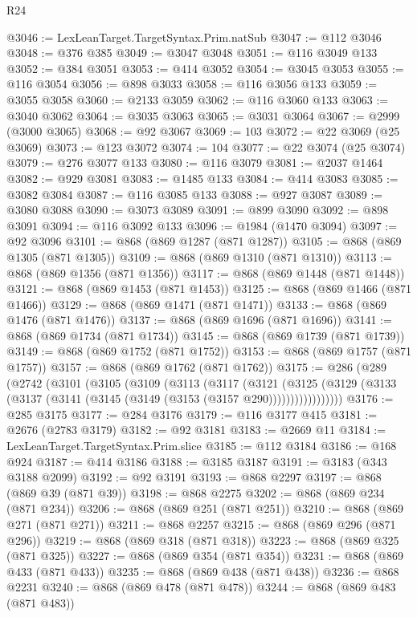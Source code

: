 \begin{lexlean}{R24}
\begin{coremodule}
@3046 := LexLeanTarget.TargetSyntax.Prim.natSub
@3047 := @112 @3046
@3048 := @376 @385
@3049 := @3047 @3048
@3051 := @116 @3049 @133
@3052 := @384 @3051
@3053 := @414 @3052
@3054 := @3045 @3053
@3055 := @116 @3054
@3056 := @898 @3033
@3058 := @116 @3056 @133
@3059 := @3055 @3058
@3060 := @2133 @3059
@3062 := @116 @3060 @133
@3063 := @3040 @3062
@3064 := @3035 @3063
@3065 := @3031 @3064
@3067 := @2999 (@3000 @3065)
@3068 := @92 @3067
@3069 := 103
@3072 := @22 @3069 (@25 @3069)
@3073 := @123 @3072
@3074 := 104
@3077 := @22 @3074 (@25 @3074)
@3079 := @276 @3077 @133
@3080 := @116 @3079
@3081 := @2037 @1464
@3082 := @929 @3081
@3083 := @1485 @133
@3084 := @414 @3083
@3085 := @3082 @3084
@3087 := @116 @3085 @133
@3088 := @927 @3087
@3089 := @3080 @3088
@3090 := @3073 @3089
@3091 := @899 @3090
@3092 := @898 @3091
@3094 := @116 @3092 @133
@3096 := @1984 (@1470 @3094)
@3097 := @92 @3096
@3101 := @868 (@869 @1287 (@871 @1287))
@3105 := @868 (@869 @1305 (@871 @1305))
@3109 := @868 (@869 @1310 (@871 @1310))
@3113 := @868 (@869 @1356 (@871 @1356))
@3117 := @868 (@869 @1448 (@871 @1448))
@3121 := @868 (@869 @1453 (@871 @1453))
@3125 := @868 (@869 @1466 (@871 @1466))
@3129 := @868 (@869 @1471 (@871 @1471))
@3133 := @868 (@869 @1476 (@871 @1476))
@3137 := @868 (@869 @1696 (@871 @1696))
@3141 := @868 (@869 @1734 (@871 @1734))
@3145 := @868 (@869 @1739 (@871 @1739))
@3149 := @868 (@869 @1752 (@871 @1752))
@3153 := @868 (@869 @1757 (@871 @1757))
@3157 := @868 (@869 @1762 (@871 @1762))
@3175 := @286
    (@289
      (@2742
        (@3101
          (@3105
            (@3109
              (@3113
                (@3117
                  (@3121
                    (@3125
                      (@3129 (@3133 (@3137 (@3141 (@3145 (@3149 (@3153 (@3157 @290)))))))))))))))))
@3176 := @285 @3175
@3177 := @284 @3176
@3179 := @116 @3177 @415
@3181 := @2676 (@2783 @3179)
@3182 := @92 @3181
@3183 := @2669 @11
@3184 := LexLeanTarget.TargetSyntax.Prim.slice
@3185 := @112 @3184
@3186 := @168 @924
@3187 := @414 @3186
@3188 := @3185 @3187
@3191 := @3183 (@343 @3188 @2099)
@3192 := @92 @3191
@3193 := @868 @2297
@3197 := @868 (@869 @39 (@871 @39))
@3198 := @868 @2275
@3202 := @868 (@869 @234 (@871 @234))
@3206 := @868 (@869 @251 (@871 @251))
@3210 := @868 (@869 @271 (@871 @271))
@3211 := @868 @2257
@3215 := @868 (@869 @296 (@871 @296))
@3219 := @868 (@869 @318 (@871 @318))
@3223 := @868 (@869 @325 (@871 @325))
@3227 := @868 (@869 @354 (@871 @354))
@3231 := @868 (@869 @433 (@871 @433))
@3235 := @868 (@869 @438 (@871 @438))
@3236 := @868 @2231
@3240 := @868 (@869 @478 (@871 @478))
@3244 := @868 (@869 @483 (@871 @483))

\end{coremodule}
\end{lexlean}
